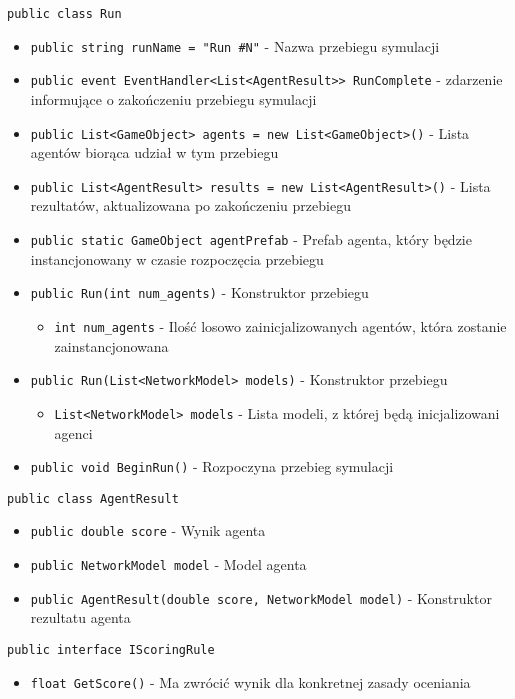 \documentclass[12pt,a4paper]{article}
\begin{document}
\lstinline{public class Run}
\begin{itemize}
    \item \lstinline|public string runName = "Run #N"| - Nazwa przebiegu symulacji
    \item \lstinline|public event EventHandler<List<AgentResult>> RunComplete| - zdarzenie informujące o zakończeniu przebiegu symulacji
    \item \lstinline|public List<GameObject> agents = new List<GameObject>()| - Lista agentów biorąca udział w tym przebiegu
    \item \lstinline|public List<AgentResult> results = new List<AgentResult>()| - Lista rezultatów, aktualizowana po zakończeniu przebiegu
    \item \lstinline|public static GameObject agentPrefab| - Prefab agenta, który będzie instancjonowany w czasie rozpoczęcia przebiegu
    \item \lstinline|public Run(int num_agents)| - Konstruktor przebiegu
          \begin{itemize}
              \item \lstinline{int num_agents} - Ilość losowo zainicjalizowanych agentów, która zostanie zainstancjonowana
          \end{itemize}
    \item \lstinline|public Run(List<NetworkModel> models)| -  Konstruktor przebiegu
          \begin{itemize}
              \item \lstinline{List<NetworkModel> models} - Lista modeli, z której będą inicjalizowani agenci
          \end{itemize}
    \item \lstinline|public void BeginRun()| - Rozpoczyna przebieg symulacji
\end{itemize}

\lstinline{public class AgentResult}
\begin{itemize}
    \item \lstinline|public double score| - Wynik agenta
    \item \lstinline|public NetworkModel model| - Model agenta
    \item \lstinline|public AgentResult(double score, NetworkModel model)| - Konstruktor rezultatu agenta
\end{itemize}


\lstinline{public interface IScoringRule}
\begin{itemize}
    \item \lstinline|float GetScore()| - Ma zwrócić wynik dla konkretnej zasady oceniania
\end{itemize}
\end{document}
